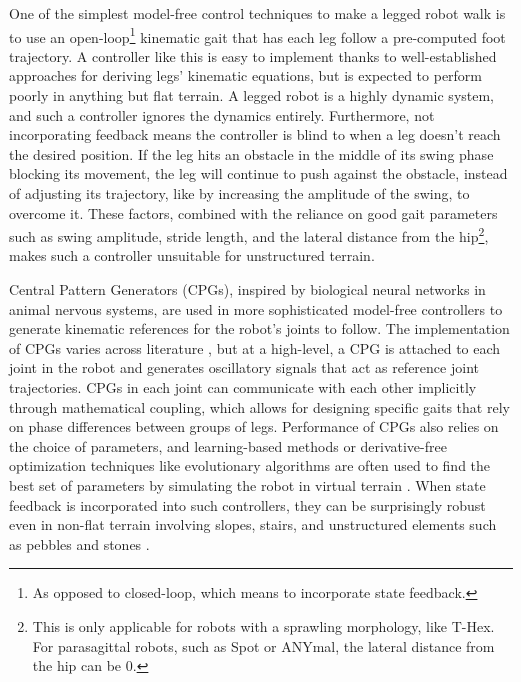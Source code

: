 One of the simplest model-free control techniques to make a legged robot walk is to use an open-loop\footnote{As opposed to closed-loop, which means to incorporate state feedback.} kinematic gait that has each leg follow a pre-computed foot trajectory\cite{sunHexapodRobotKinematics2017}. A controller like this is easy to implement thanks to well-established approaches for deriving legs' kinematic equations, but is expected to perform poorly in anything but flat terrain. A legged robot is a highly dynamic system, and such a controller ignores the dynamics entirely. Furthermore, not incorporating feedback means the controller is blind to when a leg doesn't reach the desired position. If the leg hits an obstacle in the middle of its swing phase blocking its movement, the leg will continue to push against the obstacle, instead of adjusting its trajectory, like by increasing the amplitude of the swing, to overcome it. These factors, combined with the reliance on good gait parameters such as swing amplitude, stride length, and the lateral distance from the hip\footnote{This is only applicable for robots with a sprawling morphology, like T-Hex. For parasagittal robots, such as Spot or ANYmal, the lateral distance from the hip can be 0.}, makes such a controller unsuitable for unstructured terrain. 

Central Pattern Generators (CPGs), inspired by biological neural networks in animal nervous systems, are used in more sophisticated model-free controllers to generate kinematic references for the robot's joints to follow. The implementation of CPGs varies across literature \cite{owakiQuadrupedRobotExhibiting2017, barasuolReactiveControllerFramework2013, fukuokaSimpleRuleQuadrupedal2015, AdaptiveDynamicWalking, chenLocomotionControlSensordriven2016, parkStableModifiableWalking2013, zhangTrotGaitDesign2014}, but at a high-level, a CPG is attached to each joint in the robot and generates oscillatory signals that act as reference joint trajectories. CPGs in each joint can communicate with each other implicitly through mathematical coupling, which allows for designing specific gaits that rely on phase differences between groups of legs. Performance of CPGs also relies on the choice of parameters, and learning-based methods or derivative-free optimization techniques like evolutionary algorithms are often used to find the best set of parameters by simulating the robot in virtual terrain \cite{liParameterTuningCPGs2015, renMultipleChaoticCentral2015, endoLearningCPGbasedBiped2008}. When state feedback is incorporated into such controllers, they can be surprisingly robust even in non-flat terrain involving slopes, stairs, and unstructured elements such as pebbles and stones \cite{AdaptiveDynamicWalking, barasuolReactiveControllerFramework2013, chenLocomotionControlSensordriven2016}.

